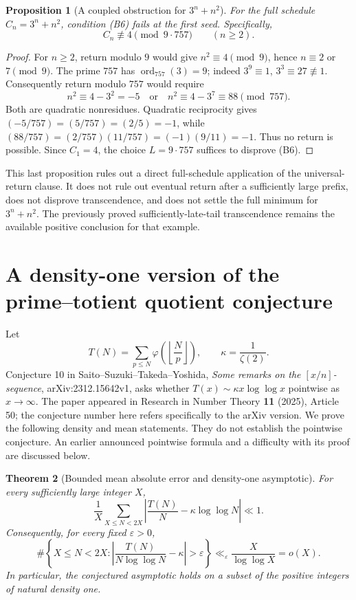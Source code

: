 \documentclass[11pt,a4paper]{article}
\newtheorem{theorem}{Theorem}[section]
\newtheorem{proposition}[theorem]{Proposition}
\theoremstyle{definition}
\theoremstyle{remark}
\numberwithin{equation}{section}
\begin{document}
\begin{proposition}[A coupled obstruction for $3^n+n^2$]
For the full schedule $C_n=3^n+n^2$, condition (B6) fails at the
first seed.  Specifically,
\[
 C_n\not\equiv4\pmod{9\cdot757}\qquad(n\ge2).
\]
\end{proposition}
\begin{proof}
For $n\ge2$, return modulo $9$ would give
$n^2\equiv4\pmod9$, hence $n\equiv2$ or $7\pmod9$.
The prime $757$ has $\operatorname{ord}_{757}(3)=9$;
indeed $3^9\equiv1$, $3^3\equiv27\not\equiv1$.
Consequently return modulo $757$ would require
\[
 n^2\equiv4-3^2=-5
 \quad\text{or}\quad
 n^2\equiv4-3^7\equiv88\pmod{757}.
\]
Both are quadratic nonresidues.  Quadratic reciprocity gives
$(-5/757)=(5/757)=(2/5)=-1$, while
$(88/757)=(2/757)(11/757)=(-1)(9/11)=-1$.
Thus no return is possible.  Since $C_1=4$, the choice
$L=9\cdot757$ suffices to disprove (B6).
\end{proof}

This last proposition rules out a direct full-schedule application of
the universal-return clause.  It does not rule out eventual return
after a sufficiently large prefix, does not disprove transcendence,
and does not settle the full minimum for $3^n+n^2$.  The previously
proved sufficiently-late-tail transcendence remains the available
positive conclusion for that example.


\section{A density-one version of the prime--totient quotient conjecture}
\label{f13:sec:quotient-density}

Let
\[
 T(N)=\sum_{p\leq N}\varphi\!\left(\left\lfloor\frac Np\right\rfloor\right),
 \qquad \kappa=\frac1{\zeta(2)}.
\]
Conjecture 10 in Saito--Suzuki--Takeda--Yoshida,
\emph{Some remarks on the $[x/n]$-sequence}, arXiv:2312.15642v1,
asks whether $T(x)\sim\kappa x\log\log x$ pointwise as $x\to\infty$.
The paper appeared in Research in Number Theory \textbf{11} (2025),
Article 50; the conjecture number here refers specifically to the arXiv
version. We prove the following density and mean statements. They do not
establish the pointwise conjecture. An earlier announced pointwise
formula and a difficulty with its proof are discussed below.

\begin{theorem}[Bounded mean absolute error and density-one asymptotic]
\label{f13:thm:quotient-density}
For every sufficiently large integer $X$,
\[
 \boxed{\frac1X\sum_{X\leq N<2X}
 \left|\frac{T(N)}{N}-\kappa\log\log N\right|\ll1.}
\]
Consequently, for every fixed $\varepsilon>0$,
\[
 \#\left\{X\leq N<2X:
  \left|\frac{T(N)}{N\log\log N}-\kappa\right|>\varepsilon\right\}
 \ll_\varepsilon\frac{X}{\log\log X}=o(X).
\]
In particular, the conjectured asymptotic holds on a subset of the
positive integers of natural density one.
\end{theorem}
\end{document}
